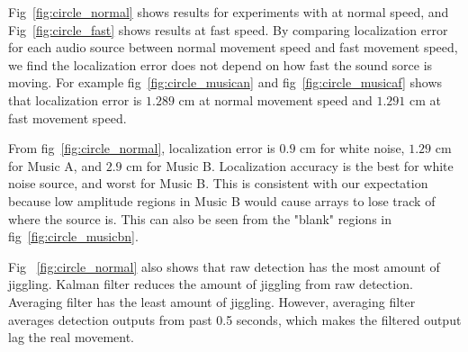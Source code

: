 Fig~\ref{fig:circle_normal} shows results for experiments with at normal speed, and Fig~\ref{fig:circle_fast} shows results at fast speed. By comparing localization error for each audio source between normal movement speed and fast movement speed, we find the localization error does not depend on how fast the sound sorce is moving. For example fig~\ref{fig:circle_musican} and fig~\ref{fig:circle_musicaf} shows that localization error is $1.289$ cm at normal movement speed and $1.291$ cm at fast movement speed.

From fig~\ref{fig:circle_normal}, localization error is $0.9$ cm for white noise, $1.29$ cm for Music A, and $2.9$ cm for Music B. Localization accuracy is the best for white noise source, and worst for Music B. This is consistent with our expectation because low amplitude regions in Music B would cause arrays to lose track of where the source is. This can also be seen from the "blank" regions in fig~\ref{fig:circle_musicbn}.

Fig ~\ref{fig:circle_normal} also shows that raw detection has the most amount of jiggling. Kalman filter reduces the amount of jiggling from raw detection. Averaging filter has the least amount of jiggling. However, averaging filter averages detection outputs from past 0.5 seconds, which makes the filtered output lag the real movement. 

